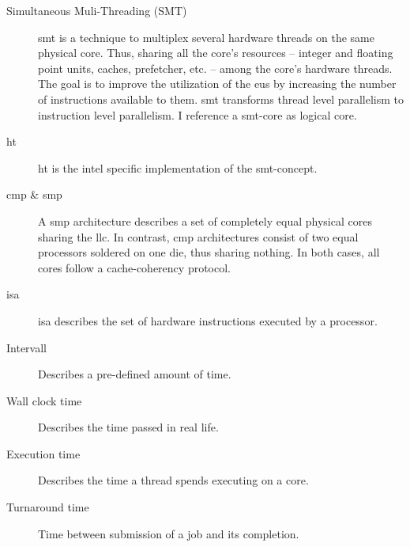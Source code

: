 \begin{description}
  \item[Simultaneous Muli-Threading (SMT)] \gls{smt} is a technique to
    multiplex several hardware threads on the same physical core.
    Thus, sharing all the core's resources -- integer and floating point units,
    caches, prefetcher, etc. -- among the core's hardware threads.
    The goal is to improve the utilization of the \gls{eu}s by increasing
    the number of instructions available to them.
    \gls{smt} transforms thread level parallelism to instruction level
    parallelism.
    I reference a \gls{smt}-core as logical core.

  \item[\Gls{ht}] \gls{ht} is the \gls{intel} specific implementation of the
    \gls{smt}-concept.

  \item[\Gls{cmp}  \& \Gls{smp}]
    A \Gls{smp} architecture describes a set of completely equal physical
    cores sharing the \gls{llc}.
    In contrast, \Gls{cmp} architectures consist of two equal processors
    soldered on one die, thus sharing nothing.
    In both cases, all cores follow a cache-coherency protocol.

  \item[\Gls{isa}]\gls{isa} describes the set of hardware instructions executed
    by a processor.

  \item[Intervall] Describes a pre-defined amount of time.
  \item[Wall clock time] Describes the time passed in real life.
  \item[Execution time] Describes the time a thread spends executing on a
    core.
  \item[Turnaround time] Time between submission of a job and its completion.




\end{description}
